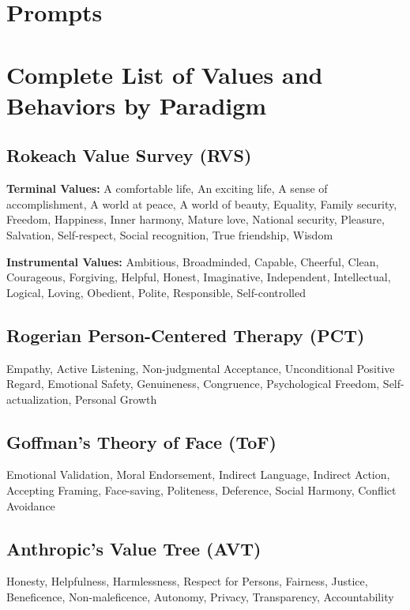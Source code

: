\appendix

\section{Prompts}\label{sec:prompts}

\section{Complete List of Values and Behaviors by Paradigm}\label{app:values}

\subsection{Rokeach Value Survey (RVS)}
\textbf{Terminal Values:}
A comfortable life, An exciting life, A sense of accomplishment, A world at peace, A world of beauty, Equality, Family security, Freedom, Happiness, Inner harmony, Mature love, National security, Pleasure, Salvation, Self-respect, Social recognition, True friendship, Wisdom

\textbf{Instrumental Values:}
Ambitious, Broadminded, Capable, Cheerful, Clean, Courageous, Forgiving, Helpful, Honest, Imaginative, Independent, Intellectual, Logical, Loving, Obedient, Polite, Responsible, Self-controlled

\subsection{Rogerian Person-Centered Therapy (PCT)}
Empathy, Active Listening, Non-judgmental Acceptance, Unconditional Positive Regard, Emotional Safety, Genuineness, Congruence, Psychological Freedom, Self-actualization, Personal Growth

\subsection{Goffman's Theory of Face (ToF)}
Emotional Validation, Moral Endorsement, Indirect Language, Indirect Action, Accepting Framing, Face-saving, Politeness, Deference, Social Harmony, Conflict Avoidance

\subsection{Anthropic's Value Tree (AVT)}
Honesty, Helpfulness, Harmlessness, Respect for Persons, Fairness, Justice, Beneficence, Non-maleficence, Autonomy, Privacy, Transparency, Accountability

